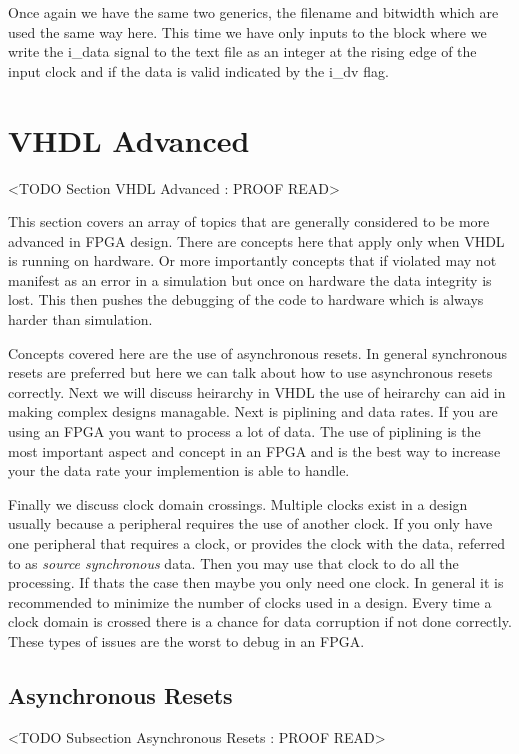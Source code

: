 Once again we have the same two generics, the filename and bitwidth which are used the same way here. This time we have only inputs to the block where we write the i\_data signal to the text file as an integer at the rising edge of the input clock and if the data is valid indicated by the i\_dv flag. 
	
\section{VHDL Advanced}
	<TODO Section VHDL Advanced : PROOF READ>

This section covers an array of topics that are generally considered to be more advanced in \ac{FPGA} design. There are concepts here that apply only when \ac{VHDL} is running on hardware. Or more importantly concepts that if violated may not manifest as an error in a simulation but once on hardware the data integrity is lost. This then pushes the debugging of the code to hardware which is always harder than simulation. 

Concepts covered here are the use of asynchronous resets. In general synchronous resets are preferred but here we can talk about how to use asynchronous resets correctly. Next we will discuss heirarchy in \ac{VHDL} the use of heirarchy can aid in making complex designs managable. Next is piplining and data rates. If you are using an \ac{FPGA} you want to process a lot of data. The use of piplining is the most important aspect and concept in an \ac{FPGA} and is the best way to increase your the data rate your implemention is able to handle. 

Finally we discuss clock domain crossings. Multiple clocks exist in a design usually because a peripheral requires the use of another clock. If you only have one peripheral that requires a clock, or provides the clock with the data, referred to as \emph{source synchronous} data. Then you may use that clock to do all the processing. If thats the case then maybe you only need one clock. In general it is recommended to minimize the number of clocks used in a design. Every time a clock domain is crossed there is a chance for data corruption if not done correctly. These types of issues are the worst to debug in an \ac{FPGA}. 
	
\subsection{Asynchronous Resets}
	<TODO Subsection Asynchronous Resets : PROOF READ>
	
